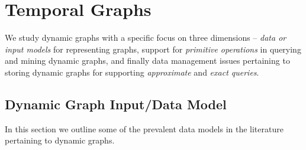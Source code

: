 \section{Temporal Graphs}
\label{sec:temporal-graphs}

We study dynamic graphs with a specific focus on three dimensions -- \emph{data or input models} for representing graphs, support for \emph{primitive operations} in querying and mining dynamic graphs, and finally data management issues pertaining to storing dynamic graphs for supporting \emph{approximate} and \emph{exact queries}.

\subsection{Dynamic Graph Input/Data Model}
\label{sec: data-model}

In this section we outline some of the prevalent data models in the literature pertaining to dynamic graphs. 

